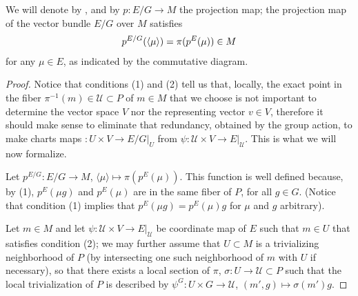 \begin{proposition}
We will denote by , and by $p:E/G \to M$ the projection map; the projection map of the vector bundle $E/G$ over $M$ satisfies 
\begin{align} \label{eqnProjectionOfQuotient}
    p^{E/G}(\left\langle \mu \right\rangle) = \pi(p^E(\mu)) \in M
\end{align}
for any $\mu \in E$, as indicated by the commutative diagram. 

\end{proposition}

\begin{proof}
Notice that conditions (1) and (2) tell us that, locally, the exact point in the fiber $\pi^{-1}(m) \in \mathcal U \subset P$ of $m \in M$ that we choose is not important to determine the vector space $V$ nor the representing vector $v \in V$, therefore it should make sense to eliminate that redundancy, obtained by the group action, to make charts maps $:U \times V \to E/G|_U$ from $\psi:\mathcal U \times V \to E|_{\mathcal U}$. This is what we will now formalize.

Let $p^{E/G}: E/G \to M$, $\langle \mu \rangle \mapsto \pi(p^E(\mu))$. This function is well defined because, by (1), $p^E(\mu g)$ and $p^E(\mu)$ are in the same fiber of $P$, for all $g \in G$. (Notice that condition (1) implies that $p^E(\mu g) = p^E(\mu) g$ for $\mu$ and $g$ arbitrary).

Let $m \in M$ and let $\psi: \mathcal U \times V \to E|_{\mathcal U}$ be coordinate map of $E$  such that $m \in U$ that satisfies condition (2); we may further assume that $U \subset M$ is a trivializing neighborhood of $P$ (by intersecting one such neighborhood of $m$ with $U$ if necessary), so that there exists a local section of $\pi$, $\sigma: U \to \mathcal U \subset P$ such that the local trivialization of $P$ is described by $\psi^G: U\times G \to \mathcal U$, $(m', g) \mapsto \sigma(m')g$.


\end{proof}
